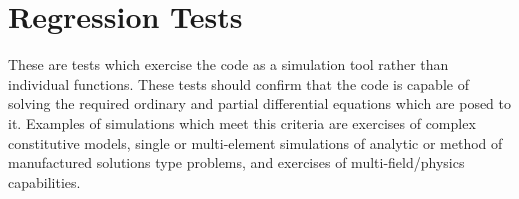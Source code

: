 \section{Regression Tests}

These are tests which exercise the code as a simulation tool rather than individual functions. These tests should confirm that the code is capable of solving the required ordinary and partial differential equations which are posed to it. Examples of simulations which meet this criteria are exercises of complex constitutive models, single or multi-element simulations of analytic or method of manufactured solutions type problems, and exercises of multi-field/physics capabilities.
